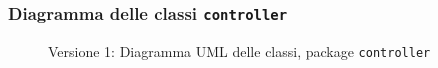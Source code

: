 \subsubsection{Diagramma delle classi \texttt{controller}}
\vspace{0.5cm}
\begin{figure}[H]
    \centering
    \caption{Versione 1: Diagramma UML delle classi, package \texttt{controller}}
    \label{fig:class_controller_v_1}
\end{figure}
